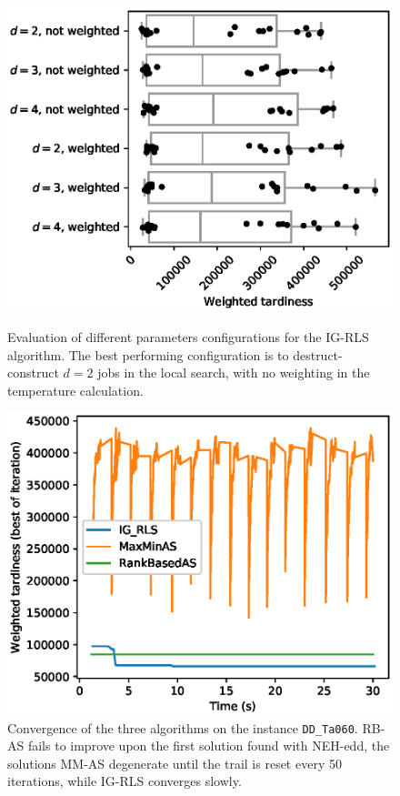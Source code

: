 \documentclass[runningheads]{llncs}
\begin{document}
\begin{figure}
    \centering
    \begin{minipage}{.48\textwidth}
		\centering
		\includegraphics[width=1.1\textwidth]{IG_RLS-params.eps}
		\caption{Evaluation of different parameters configurations for the
		IG-RLS algorithm. The best performing configuration is to
		destruct-construct $d=2$ jobs in the local search, with no weighting in
		the temperature calculation.}
		\label{IG_RLS-params}
    \end{minipage}
    \hspace{0.02\textwidth}
    \begin{minipage}{.48\textwidth}
		\centering
		\includegraphics[width=1.1\textwidth]{DD_Ta060-convergence.eps}
		\caption{Convergence of the three algorithms on the instance \texttt{DD\_Ta060}. RB-AS fails to improve upon the first solution found
		with NEH-edd, the solutions MM-AS degenerate until the trail is reset
		every 50 iterations, while IG-RLS converges slowly.}
		\label{convergence}
    \end{minipage}
\end{figure}
\end{document}
